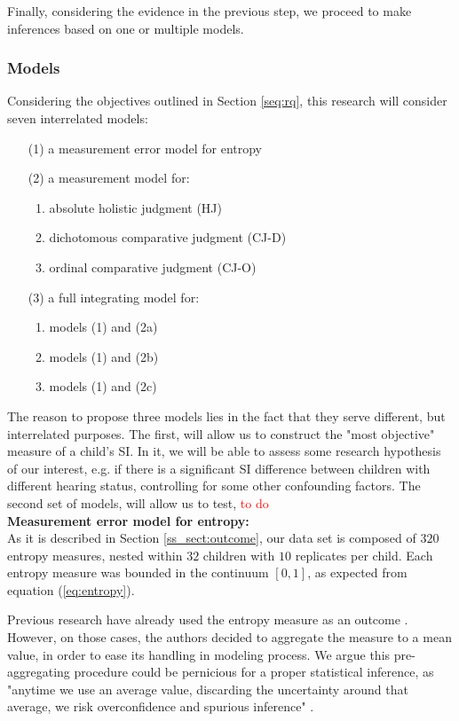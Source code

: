 Finally, considering the evidence in the previous step, we proceed to make inferences based on one or multiple models.
%
%
\subsubsection{Models}
%
Considering the objectives outlined in Section \ref{seq:rq}, this research will consider seven interrelated models: 
\begin{enumerate} \itemsep1pt
	\item[(1)] a measurement error model for entropy
	\item[(2)] a measurement model for: 
	\begin{enumerate} \itemsep1pt
		\item absolute holistic judgment (HJ)
		\item dichotomous comparative judgment (CJ-D)
		\item ordinal comparative judgment (CJ-O)
	\end{enumerate}
	\item[(3)] a full integrating model for: 
	\begin{enumerate} \itemsep1pt
		\item models (1) and (2a)
		\item models (1) and (2b)
		\item models (1) and (2c)
	\end{enumerate}
\end{enumerate} 

The reason to propose three models lies in the fact that they serve different, but interrelated purposes. The first, will allow us to construct the "most objective" measure of a child's SI. In it, we will be able to assess some research hypothesis of our interest, e.g. if there is a significant SI difference between children with different hearing status, controlling for some other confounding factors. The second set of models, will allow us to test, \textcolor{red}{to do} \\

\noindent \textbf{Measurement error model for entropy:} \\
%
As it is described in Section \ref{ss_sect:outcome}, our data set is composed of $320$ entropy measures, nested within $32$ children with $10$ replicates per child. Each entropy measure was bounded in the continuum $[0,1]$, as expected from equation (\ref{eq:entropy}).

Previous research have already used the entropy measure as an outcome \citep{Boonen_et_al_2021, Faes_et_al_2021}. However, on those cases, the authors decided to aggregate the measure to a mean value, in order to ease its handling in modeling process. We argue this pre-aggregating procedure could be pernicious for a proper statistical inference, as "anytime we use an average value, discarding the uncertainty around that average, we risk overconfidence and spurious inference" \citep{McElreath_2020}. 

